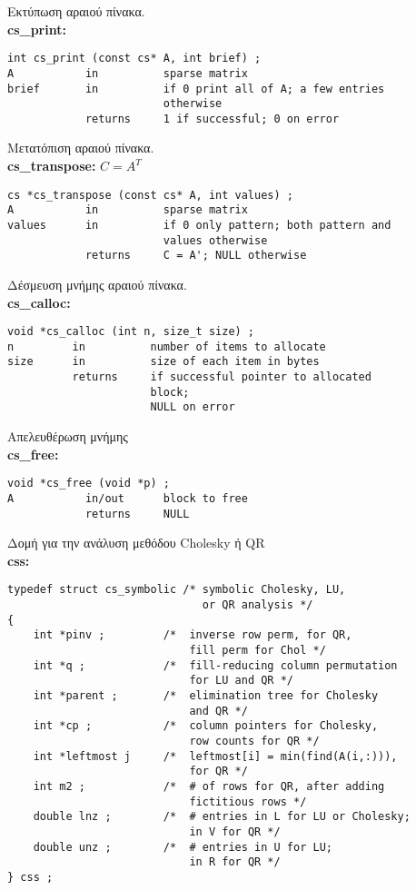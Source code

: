 Εκτύπωση αραιού πίνακα.\\
\textbf{cs\_print:}
\begin{verbatim}
int cs_print (const cs* A, int brief) ;
A           in          sparse matrix
brief       in          if 0 print all of A; a few entries 
                        otherwise
            returns     1 if successful; 0 on error
\end{verbatim}

Μετατόπιση αραιού πίνακα.\\
\textbf{cs\_transpose:} $C = A^T$
\begin{verbatim}
cs *cs_transpose (const cs* A, int values) ;
A           in          sparse matrix
values      in          if 0 only pattern; both pattern and 
                        values otherwise
            returns     C = A'; NULL otherwise
\end{verbatim}


Δέσμευση μνήμης αραιού πίνακα.\\
\textbf{cs\_calloc:}
\begin{verbatim}
void *cs_calloc (int n, size_t size) ;
n         in          number of items to allocate
size      in          size of each item in bytes
          returns     if successful pointer to allocated 
                      block; 
                      NULL on error
\end{verbatim}

Απελευθέρωση μνήμης\\
\textbf{cs\_free:}
\begin{verbatim}
void *cs_free (void *p) ;
A           in/out      block to free
            returns     NULL
\end{verbatim}

Δομή για την ανάλυση μεθόδου \textlatin{Cholesky} ή \textlatin{QR}\\
\textbf{css:}
\begin{verbatim}
typedef struct cs_symbolic /* symbolic Cholesky, LU, 
                              or QR analysis */
{
    int *pinv ;         /*  inverse row perm, for QR, 
                            fill perm for Chol */
    int *q ;            /*  fill-reducing column permutation 
                            for LU and QR */
    int *parent ;       /*  elimination tree for Cholesky 
                            and QR */
    int *cp ;           /*  column pointers for Cholesky, 
                            row counts for QR */
    int *leftmost j     /*  leftmost[i] = min(find(A(i,:))), 
                            for QR */
    int m2 ;            /*  # of rows for QR, after adding 
                            fictitious rows */
    double lnz ;        /*  # entries in L for LU or Cholesky; 
                            in V for QR */
    double unz ;        /*  # entries in U for LU; 
                            in R for QR */
} css ;
\end{verbatim}

